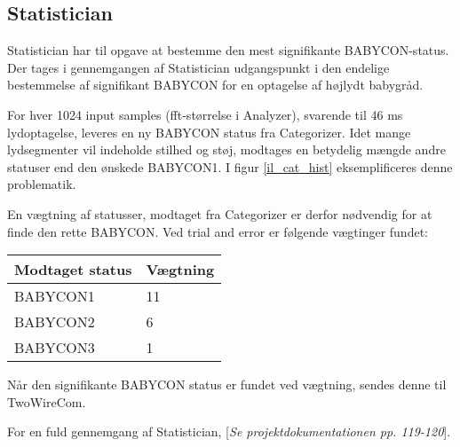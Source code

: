 \subsection{Statistician}

Statistician har til opgave at bestemme den mest signifikante BABYCON-status. Der tages i gennemgangen af Statistician udgangspunkt i den endelige bestemmelse af signifikant BABYCON for en optagelse af højlydt babygråd.
 
For hver 1024 input samples (fft-størrelse i Analyzer), svarende til 46 ms lydoptagelse, leveres en ny BABYCON status fra Categorizer. Idet mange lydsegmenter vil indeholde stilhed og støj, modtages en betydelig mængde andre statuser end den ønskede BABYCON1. I figur \ref{il_cat_hist} eksemplificeres denne problematik.


En vægtning af statusser, modtaget fra Categorizer er derfor nødvendig for at finde den rette BABYCON. Ved trial and error er følgende vægtinger fundet:
\begin{center}
    \begin{tabular}{ | l | l |}
    \hline
    \textbf{Modtaget status}	& \textbf{Vægtning}		\\ \hline
    BABYCON1							& 11					\\ \hline
    BABYCON2							& 6						\\ \hline
    BABYCON3							& 1						\\ \hline   
    \end{tabular}
\end{center}

Når den signifikante BABYCON status er fundet ved vægtning, sendes denne til TwoWireCom.

For en fuld gennemgang af Statistician, [\textit{Se projektdokumentationen pp. 119-120}].
